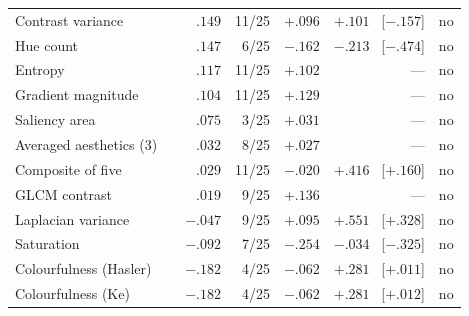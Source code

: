 \begin{table}[!ht]
\begin{tabular}{@{}l l r r r r c@{}}
Contrast variance & \citep{jeong2016static} & $.149$ & 11/25 & $+.096$ & $+.101$ \ \tiny[$-.157$] & no \\
\rowcolor{rowlight}Hue count & \citep{ke2006highlevel} & $.147$ & 6/25 & $-.162$ & $-.213$ \ \tiny[$-.474$] & no \\
Entropy & \citep{qaroush2025diversity} & $.117$ & 11/25 & $+.102$ & --- & no \\
\rowcolor{rowlight}Gradient magnitude & \citep{qaroush2025diversity} & $.104$ & 11/25 & $+.129$ & --- & no \\
Saliency area & \citep{qaroush2025diversity} & $.075$ & 3/25 & $+.031$ & --- & no \\
\rowcolor{rowlight}Averaged aesthetics (3) & \citep{gygli2014summe} & $.032$ & 8/25 & $+.027$ & --- & no \\
Composite of five & \citep{srinivas2016rank} & $.029$ & 11/25 & $-.020$ & $+.416$ \ \tiny[$+.160$] & no \\
\rowcolor{rowlight}GLCM contrast & \citep{yang2024keyframe} & $.019$ & 9/25 & $+.136$ & --- & no \\
Laplacian variance & \citep{cakmak2025tripss} & $-.047$ & 9/25 & $+.095$ & $+.551$ \ \tiny[$+.328$] & no \\
\rowcolor{rowlight}Saturation & \citep{huang2024aesthetic} & $-.092$ & 7/25 & $-.254$ & $-.034$ \ \tiny[$-.325$] & no \\
Colourfulness (Hasler) & \citep{hasler2003colorfulness} & $-.182$ & 4/25 & $-.062$ & $+.281$ \ \tiny[$+.011$] & no \\
\rowcolor{rowlight}Colourfulness (Ke) & \citep{ke2006highlevel} & $-.182$ & 4/25 & $-.062$ & $+.281$ \ \tiny[$+.012$] & no \\
\bottomrule
\end{tabular}
\end{table}

